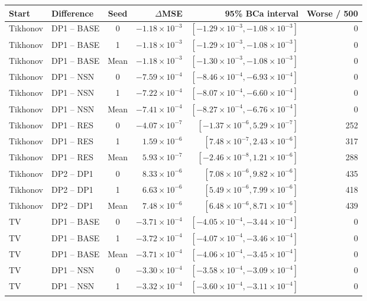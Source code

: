 \begingroup\small\setlength{\tabcolsep}{4pt}\renewcommand{\arraystretch}{1.1}
\begin{tabular}{@{}llcrrr@{}}
\toprule
Start & Difference & Seed & $\Delta$MSE & 95\% BCa interval & Worse / 500 \\ \midrule
Tikhonov & DP1 -- BASE & 0 & $-1.18\times10^{-3}$ & $[-1.29\times10^{-3}, -1.08\times10^{-3}]$ & 0 \\
Tikhonov & DP1 -- BASE & 1 & $-1.18\times10^{-3}$ & $[-1.29\times10^{-3}, -1.08\times10^{-3}]$ & 0 \\
Tikhonov & DP1 -- BASE & Mean & $-1.18\times10^{-3}$ & $[-1.30\times10^{-3}, -1.08\times10^{-3}]$ & 0 \\
Tikhonov & DP1 -- NSN & 0 & $-7.59\times10^{-4}$ & $[-8.46\times10^{-4}, -6.93\times10^{-4}]$ & 0 \\
Tikhonov & DP1 -- NSN & 1 & $-7.22\times10^{-4}$ & $[-8.07\times10^{-4}, -6.60\times10^{-4}]$ & 0 \\
Tikhonov & DP1 -- NSN & Mean & $-7.41\times10^{-4}$ & $[-8.27\times10^{-4}, -6.76\times10^{-4}]$ & 0 \\
Tikhonov & DP1 -- RES & 0 & $-4.07\times10^{-7}$ & $[-1.37\times10^{-6}, 5.29\times10^{-7}]$ & 252 \\
Tikhonov & DP1 -- RES & 1 & $1.59\times10^{-6}$ & $[7.48\times10^{-7}, 2.43\times10^{-6}]$ & 317 \\
Tikhonov & DP1 -- RES & Mean & $5.93\times10^{-7}$ & $[-2.46\times10^{-8}, 1.21\times10^{-6}]$ & 288 \\
Tikhonov & DP2 -- DP1 & 0 & $8.33\times10^{-6}$ & $[7.08\times10^{-6}, 9.82\times10^{-6}]$ & 435 \\
Tikhonov & DP2 -- DP1 & 1 & $6.63\times10^{-6}$ & $[5.49\times10^{-6}, 7.99\times10^{-6}]$ & 418 \\
Tikhonov & DP2 -- DP1 & Mean & $7.48\times10^{-6}$ & $[6.48\times10^{-6}, 8.71\times10^{-6}]$ & 439 \\
TV & DP1 -- BASE & 0 & $-3.71\times10^{-4}$ & $[-4.05\times10^{-4}, -3.44\times10^{-4}]$ & 0 \\
TV & DP1 -- BASE & 1 & $-3.72\times10^{-4}$ & $[-4.07\times10^{-4}, -3.46\times10^{-4}]$ & 0 \\
TV & DP1 -- BASE & Mean & $-3.71\times10^{-4}$ & $[-4.06\times10^{-4}, -3.45\times10^{-4}]$ & 0 \\
TV & DP1 -- NSN & 0 & $-3.30\times10^{-4}$ & $[-3.58\times10^{-4}, -3.09\times10^{-4}]$ & 0 \\
TV & DP1 -- NSN & 1 & $-3.32\times10^{-4}$ & $[-3.60\times10^{-4}, -3.11\times10^{-4}]$ & 0 \\

\end{tabular}

